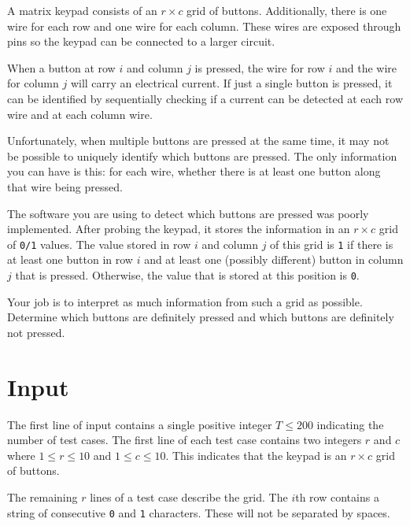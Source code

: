

%


A matrix keypad consists of an $r \times c$ grid of buttons.
Additionally, there is one wire for each row and one wire for each
column.  These wires are exposed through pins so the keypad can be
connected to a larger circuit.

When a button at row $i$ and column $j$ is pressed, the wire for row
$i$ and the wire for column $j$ will carry an electrical current.  If
just a single button is pressed, it can be identified by sequentially
checking if a current can be detected at each row wire and at each
column wire.

Unfortunately, when multiple buttons are pressed at the same time, it
may not be possible to uniquely identify which buttons are pressed.
The only information you can have is this: for each wire, whether
there is at least one button along that wire being pressed.


The software you are using to detect which buttons are pressed was
poorly implemented.  After probing the keypad, it stores the
information in an $r \times c$ grid of \texttt{0/1} values. The value
stored in row $i$ and column $j$ of this grid is \texttt{1} if there
is at least one button in row $i$ and at least one (possibly
different) button in column $j$ that is pressed.  Otherwise, the value
that is stored at this position is \texttt{0}.

Your job is to interpret as much information from such a grid as possible.
Determine which buttons are definitely pressed and which buttons are definitely
not pressed.

\section*{Input}
The first line of input contains a single positive integer $T \leq 200$ indicating
the number of test cases. The first line of each test case
contains two integers $r$ and $c$ where $1 \leq r \leq 10$
and $1 \leq c \leq 10$. This indicates that the keypad is an $r \times c$
grid of buttons.

The remaining $r$ lines of a test case describe the grid. The $i$th row
contains a string of consecutive \texttt{0} and
\texttt{1} characters. These will not be separated by spaces.

